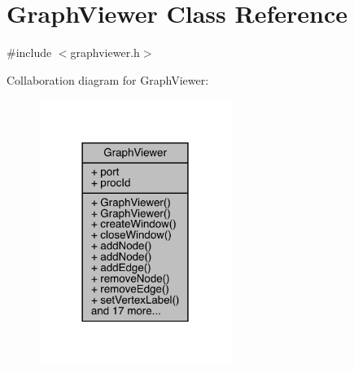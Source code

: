 \hypertarget{class_graph_viewer}{}\section{Graph\+Viewer Class Reference}
\label{class_graph_viewer}


{\ttfamily \#include $<$graphviewer.\+h$>$}



Collaboration diagram for Graph\+Viewer\+:\nopagebreak
\begin{figure}[H]
\begin{center}
\leavevmode
\includegraphics[width=177pt]{class_graph_viewer__coll__graph}
\end{center}
\end{figure}
